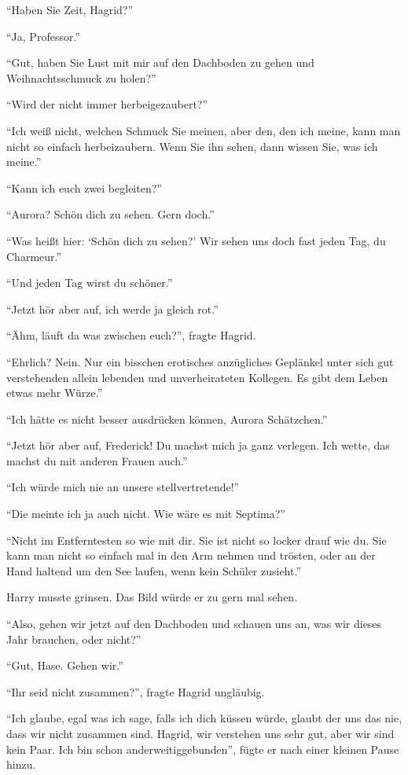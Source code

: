 \enquote{Haben Sie Zeit, Hagrid?}

\enquote{Ja, Professor.}

\enquote{Gut, haben Sie Lust mit mir auf den Dachboden zu gehen und Weihnachtsschmuck zu holen?}

\enquote{Wird der nicht immer herbeigezaubert?}

\enquote{Ich weiß nicht, welchen Schmuck Sie meinen, aber den, den ich meine, kann man nicht so einfach herbeizaubern. Wenn Sie ihn sehen, dann wissen Sie, was ich meine.}

\enquote{Kann ich euch zwei begleiten?}

\enquote{Aurora? Schön dich zu sehen. Gern doch.}

\enquote{Was heißt hier: \enquote{Schön dich zu sehen?} Wir sehen uns doch fast jeden Tag, du Charmeur.}

\enquote{Und jeden Tag wirst du schöner.}

\enquote{Jetzt hör aber auf, ich werde ja gleich rot.}

\enquote{Ähm, läuft da was zwischen euch?}, fragte Hagrid.

\enquote{Ehrlich? Nein. Nur ein bisschen erotisches anzügliches Geplänkel unter sich gut verstehenden allein lebenden und unverheirateten Kollegen. Es gibt dem Leben etwas mehr Würze.}

\enquote{Ich hätte es nicht besser ausdrücken können, Aurora Schätzchen.}

\enquote{Jetzt hör aber auf, Frederick! Du machst mich ja ganz verlegen. Ich wette, das machst du mit anderen Frauen auch.}

\enquote{Ich würde mich nie an unsere stellvertretende\abs!}

\enquote{Die meinte ich ja auch nicht. Wie wäre es mit Septima?}

\enquote{Nicht im Entferntesten so wie mit dir. Sie ist nicht so locker drauf wie du. Sie kann man nicht so einfach mal in den Arm nehmen und trösten, oder an der Hand haltend um den See laufen, wenn kein Schüler zusieht.}

Harry musste grinsen. Das Bild würde er zu gern mal sehen.

\enquote{Also, gehen wir jetzt auf den Dachboden und schauen uns an, was wir dieses Jahr brauchen, oder nicht?}

\enquote{Gut, Hase. Gehen wir.}

\enquote{Ihr seid nicht zusammen?}, fragte Hagrid ungläubig.

\enquote{Ich glaube, egal was ich sage, falls ich dich küssen würde, glaubt der uns das nie, dass wir nicht zusammen sind. \gst Hagrid, wir verstehen uns sehr gut, aber wir sind kein Paar. Ich bin schon anderweitig\abs gebunden}, fügte er nach einer kleinen Pause hinzu.

